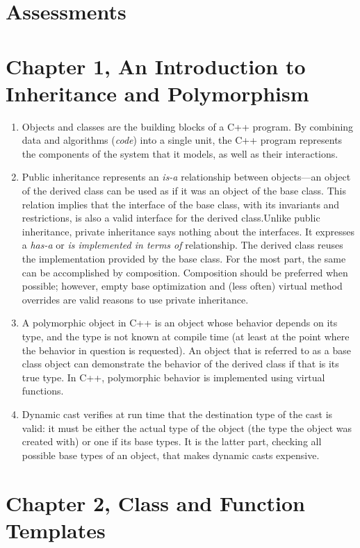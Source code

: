 

\section{Assessments}

\section{Chapter 1, An Introduction to Inheritance and Polymorphism}

\begin{enumerate}
\item
  Objects and classes are the building blocks of a C++ program. By combining data and algorithms (\emph{code}) into a single unit, the C++ program represents the components of the system that it models, as well as their interactions.
\item
  Public inheritance represents an \emph{is-a} relationship between objects---an object of the derived class can be used as if it was an object of the base class. This relation implies that the interface of the base class, with its invariants and restrictions, is also a valid interface for the derived class.Unlike public inheritance, private inheritance says nothing about the interfaces. It expresses a \emph{has-a} or \emph{is implemented in terms of} relationship. The derived class reuses the implementation provided by the base class. For the most part, the same can be accomplished by composition. Composition should be preferred when possible; however, empty base optimization and (less often) virtual method overrides are valid reasons to use private inheritance.
\item
  A polymorphic object in C++ is an object whose behavior depends on its type, and the type is not known at compile time (at least at the point where the behavior in question is requested). An object that is referred to as a base class object can demonstrate the behavior of the derived class if that is its true type. In C++, polymorphic behavior is implemented using virtual functions.
\item
  Dynamic cast verifies at run time that the destination type of the cast is valid: it must be either the actual type of the object (the type the object was created with) or one if its base types. It is the latter part, checking all possible base types of an object, that makes dynamic casts expensive.
\end{enumerate}

\section{Chapter 2, Class and Function Templates}

